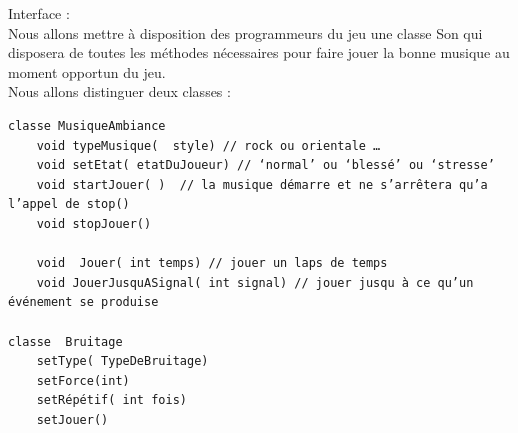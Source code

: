 \documentclass[a4paper,10pt]{article}
\begin{document}
Interface :\\

Nous allons mettre à disposition des programmeurs du jeu une classe Son qui disposera de toutes les méthodes nécessaires pour faire jouer la bonne musique au moment opportun du jeu. \\

Nous allons distinguer deux classes :\\
\begin{verbatim}
classe MusiqueAmbiance
	void typeMusique(  style) // rock ou orientale …
	void setEtat( etatDuJoueur) // ‘normal’ ou ‘blessé’ ou ‘stresse’
	void startJouer( )  // la musique démarre et ne s’arrêtera qu’a l’appel de stop()
	void stopJouer()

	void  Jouer( int temps) // jouer un laps de temps
	void JouerJusquASignal( int signal) // jouer jusqu à ce qu’un événement se produise

classe  Bruitage
	setType( TypeDeBruitage)
	setForce(int)
	setRépétif( int fois)
	setJouer()
\end{verbatim}
\end{document}
